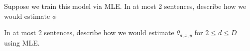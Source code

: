 \documentclass[11pt,addpoints,answers]{exam}
\newcommand{\sall}{\textbf{Select all that apply: }}
\begin{document}
\begin{questions}
\begin{parts}
\begin{subparts}
\begin{your_solution}[width = 4cm,height=2cm]
        \end{your_solution}
        

        \subpart[2] Suppose we train this model via MLE. In at most 2 sentences, 
        describe how we would estimate $\phi$\\
        \begin{your_solution}[height=3cm]
    
        \end{your_solution}


        \subpart[2] In at most 2 sentences, describe how we would estimate $\theta_{d,x,y}$ for $2 \leq d \leq D$ using MLE.\\

        \begin{your_solution}[height=3cm]
    
        \end{your_solution}


        

        
    \end{subparts}
    

 
    
    
    


\end{parts}
\end{questions}
\end{document}
